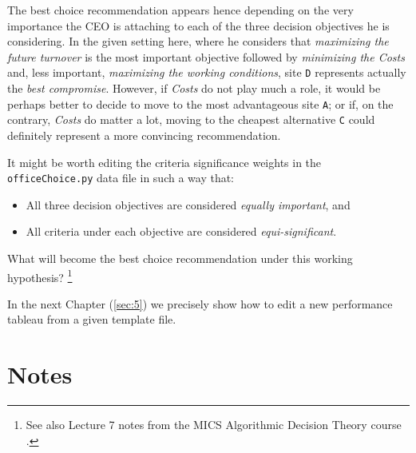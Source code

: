 The best choice recommendation appears hence depending on the very importance the CEO is attaching to each of the three decision objectives he is considering. In the given setting here, where he considers that \emph{maximizing the future turnover} is the most important objective followed by \emph{minimizing the Costs} and, less important, \emph{maximizing the working conditions}, site \texttt{D} represents actually the \emph{best compromise}. However, if \emph{Costs} do not play much a role, it would be perhaps better to decide to move to the most advantageous site \texttt{A}; or if, on the contrary, \emph{Costs} do matter a lot, moving to the cheapest alternative \texttt{C} could definitely represent a more convincing recommendation. 

It might be worth editing the criteria significance weights in the\\
\texttt{officeChoice.py} data file in such a way that:
\begin{itemize}
\item All three decision objectives are considered \emph{equally important}, and
\item All criteria under each objective are considered \emph{equi-significant}.
\end{itemize}
What will become the best choice recommendation under this working hypothesis? \footnote{See also Lecture 7 notes from the MICS Algorithmic Decision Theory course \citep{ADT-L7}.} 

In the next Chapter (\ref{sec:5}) we precisely show how to edit a new performance tableau from a given template file. 

{}
\section*{Notes}

